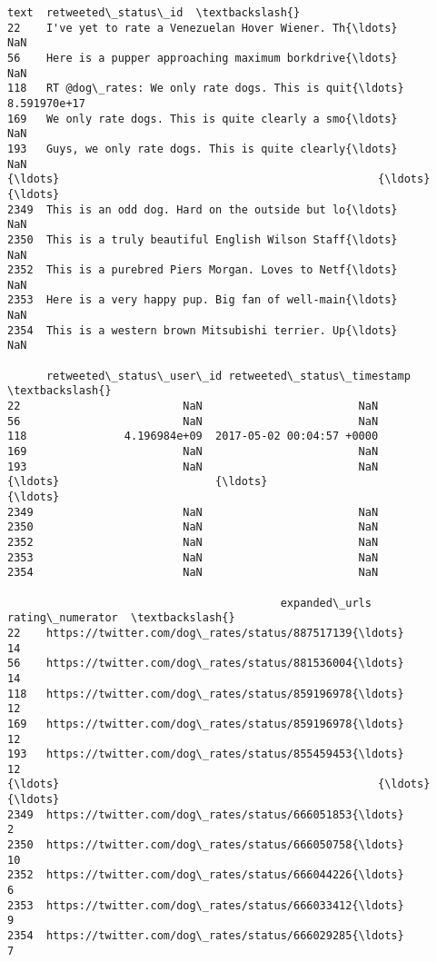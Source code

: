 \documentclass[11pt]{article}
\begin{document}
\begin{tcolorbox}[breakable, size=fbox, boxrule=.5pt, pad at break*=1mm, opacityfill=0]
\begin{Verbatim}[commandchars=\\\{\}]
                                                   text  retweeted\_status\_id  \textbackslash{}
22    I've yet to rate a Venezuelan Hover Wiener. Th{\ldots}                  NaN
56    Here is a pupper approaching maximum borkdrive{\ldots}                  NaN
118   RT @dog\_rates: We only rate dogs. This is quit{\ldots}         8.591970e+17
169   We only rate dogs. This is quite clearly a smo{\ldots}                  NaN
193   Guys, we only rate dogs. This is quite clearly{\ldots}                  NaN
{\ldots}                                                 {\ldots}                  {\ldots}
2349  This is an odd dog. Hard on the outside but lo{\ldots}                  NaN
2350  This is a truly beautiful English Wilson Staff{\ldots}                  NaN
2352  This is a purebred Piers Morgan. Loves to Netf{\ldots}                  NaN
2353  Here is a very happy pup. Big fan of well-main{\ldots}                  NaN
2354  This is a western brown Mitsubishi terrier. Up{\ldots}                  NaN

      retweeted\_status\_user\_id retweeted\_status\_timestamp  \textbackslash{}
22                         NaN                        NaN
56                         NaN                        NaN
118               4.196984e+09  2017-05-02 00:04:57 +0000
169                        NaN                        NaN
193                        NaN                        NaN
{\ldots}                        {\ldots}                        {\ldots}
2349                       NaN                        NaN
2350                       NaN                        NaN
2352                       NaN                        NaN
2353                       NaN                        NaN
2354                       NaN                        NaN

                                          expanded\_urls  rating\_numerator  \textbackslash{}
22    https://twitter.com/dog\_rates/status/887517139{\ldots}                14
56    https://twitter.com/dog\_rates/status/881536004{\ldots}                14
118   https://twitter.com/dog\_rates/status/859196978{\ldots}                12
169   https://twitter.com/dog\_rates/status/859196978{\ldots}                12
193   https://twitter.com/dog\_rates/status/855459453{\ldots}                12
{\ldots}                                                 {\ldots}               {\ldots}
2349  https://twitter.com/dog\_rates/status/666051853{\ldots}                 2
2350  https://twitter.com/dog\_rates/status/666050758{\ldots}                10
2352  https://twitter.com/dog\_rates/status/666044226{\ldots}                 6
2353  https://twitter.com/dog\_rates/status/666033412{\ldots}                 9
2354  https://twitter.com/dog\_rates/status/666029285{\ldots}                 7


\end{Verbatim}
\end{tcolorbox}
\end{document}

